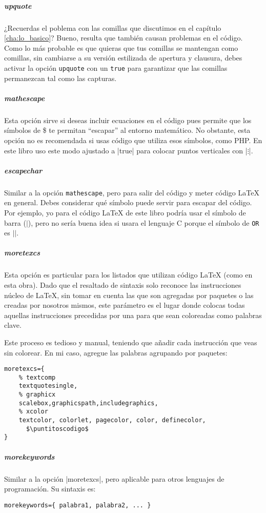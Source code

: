 \subparagraph{upquote} ¿Recuerdas el poblema con las comillas que discutimos en el capítulo \ref{cha:lo_basico}? Bueno, resulta que también causan problemas en el código. Como lo más probable es que quieras que tus comillas se mantengan como comillas, sin cambiarse a su versión estilizada de apertura y clausura, debes activar la opción \texttt{upquote} con un \texttt{true} para garantizar que las comillas permanezcan tal como las capturas.

\subparagraph{mathescape} Esta opción sirve si deseas incluir ecuaciones en el código pues permite que los símbolos de \$ te permitan ``escapar'' al entorno matemático. No obstante, esta opción no es recomendada si usas código que utiliza esos símbolos, como PHP. En este libro uso este modo ajustado a |true| para colocar puntos verticales con |$\vdots$|.

\subparagraph{escapechar} Similar a la opción \texttt{mathescape}, pero para salir del código y meter código \LaTeX{} en general. Debes considerar qué símbolo puede servir para escapar del código. Por ejemplo, yo para el código \LaTeX{} de este libro podría usar el símbolo de barra ($\vert$), pero no sería buena idea si usara el lenguaje C porque el símbolo de \texttt{OR} es \texttt{$\vert\vert$}.

\subparagraph{moretexcs} Esta opción es particular para los listados que utilizan código \LaTeX{} (como en esta obra). Dado que el resaltado de sintaxis solo reconoce las instrucciones núcleo de \LaTeX{}, sin tomar en cuenta las que son agregadas por paquetes o las creadas por nosotros mismos, este parámetro es el lugar donde colocas todas aquellas instrucciones precedidas por una \codigo{} para que sean coloreadas como palabras clave.

Este proceso es tedioso y manual, teniendo que añadir cada instrucción que veas sin colorear. En mi caso, agregue las palabras agrupando por paquetes:

\begin{lstlisting}[style=latex]
moretexcs={
    % textcomp
    textquotesingle,
    % graphicx
    scalebox,graphicspath,includegraphics,
    % xcolor
    textcolor, colorlet, pagecolor, color, definecolor,
      $\puntitoscodigo$
}
\end{lstlisting}

\subparagraph{morekeywords} Similar a la opción |moretexcs|, pero aplicable para otros lenguajes de programación. Su sintaxis es:

\begin{lstlisting}[style=latex]
morekeywords={ palabra1, palabra2, ... }
\end{lstlisting}



